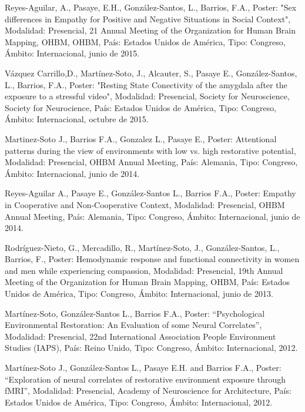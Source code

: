 
\item  Reyes-Aguilar, A., Pasaye, E.H., González-Santos, L., Barrios, F.A., Poster: "Sex differences in Empathy for Positive 
and 
Negative Situations in Social Context", Modalidad: Presencial, 21 Annual Meeting of the Organization for Human Brain Mapping, 
OHBM, OHBM, País: Estados Unidos de América, Tipo: Congreso, Ámbito: Internacional, junio de 2015.

\item  Vázquez Carrillo,D., Martínez-Soto, J., Alcauter, S., Pasaye E., González-Santos, L., Barrios, F.A.,
Poster: "Resting State Conectivity of the amygdala after the exposure to a stressful video", Modalidad: Presencial, Society 
for Neuroscience, Society for Neurocience, País: Estados Unidos de América, Tipo: Congreso, Ámbito: Internacional, octubre de 
2015.

\item  Martinez-Soto J., Barrios F.A., Gonzalez L., Pasaye E., Poster: Attentional patterns during the view of environments 
with 
low vs. high restorative potential, Modalidad: Presencial, OHBM Annual Meeting, País: Alemania, Tipo: Congreso, Ámbito: 
Internacional, junio de 2014.

\item  Reyes-Aguilar A., Pasaye E., González-Santos L., Barrios F.A., Poster: Empathy in Cooperative and Non-Cooperative 
Context, 
Modalidad: Presencial, OHBM Annual Meeting, País: Alemania, Tipo: Congreso, Ámbito: Internacional, junio de 2014.

\item  Rodríguez-Nieto, G., Mercadillo, R., Martínez-Soto, J., González-Santos, L., Barrios, F., Poster: Hemodynamic response 
and 
functional connectivity in women and men while experiencing compassion, Modalidad: Presencial, 19th Annual Meeting of the 
Organization for Human Brain Mapping, OHBM, País: Estados Unidos de América, Tipo: Congreso, Ámbito: Internacional, junio de 
2013.

\item  Martínez-Soto, González-Santos L., Barrios F.A., Poster: “Psychological Environmental Restoration: An Evaluation of 
some 
Neural Correlates”, Modalidad: Presencial, 22nd International Association People Environment Studies (IAPS), País: Reino 
Unido, Tipo: Congreso, Ámbito: Internacional, 2012.

\item  Martínez-Soto J., González-Santos L., Pasaye E.H. and Barrios F.A., Poster: “Exploration of neural correlates of 
restorative environment exposure through fMRI”, Modalidad: Presencial, Academy of Neuroscience for Architecture, País: 
Estados Unidos de América, Tipo: Congreso, Ámbito: Internacional, 2012.

